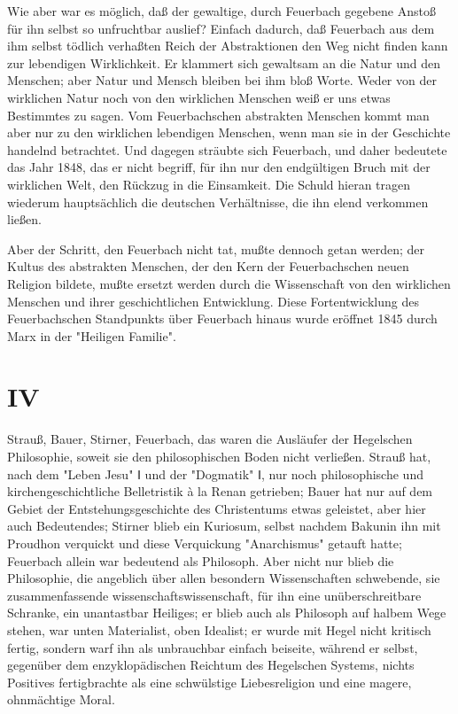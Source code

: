 Wie aber war es möglich, daß der gewaltige, durch Feuerbach
gegebene Anstoß für ihn selbst so unfruchtbar auslief? Einfach dadurch,
daß Feuerbach aus dem ihm selbst tödlich verhaßten Reich der
Abstraktionen den Weg nicht finden kann zur lebendigen Wirklichkeit. Er
klammert sich gewaltsam an die Natur und den Menschen; aber Natur und
Mensch bleiben bei ihm bloß Worte. Weder von der wirklichen Natur noch
von den wirklichen Menschen weiß er uns etwas Bestimmtes zu sagen. Vom
Feuerbachschen abstrakten Menschen kommt man aber nur zu den wirklichen
lebendigen Menschen, wenn man sie in der Geschichte handelnd betrachtet.
Und dagegen sträubte sich Feuerbach, und daher bedeutete das Jahr 1848,
das er nicht begriff, für ihn nur den endgültigen Bruch mit der
wirklichen Welt, den Rückzug in die Einsamkeit. Die Schuld hieran tragen
wiederum hauptsächlich die deutschen Verhältnisse, die ihn elend
verkommen ließen.

Aber der Schritt, den Feuerbach nicht tat, mußte dennoch getan
werden; der Kultus des abstrakten Menschen, der den Kern der
Feuerbachschen neuen Religion bildete, mußte ersetzt werden durch die
Wissenschaft von den wirklichen Menschen und ihrer geschichtlichen
Entwicklung. Diese Fortentwicklung des Feuerbachschen Standpunkts über
Feuerbach hinaus wurde eröffnet 1845 durch Marx in der "Heiligen
Familie".

\pagebreak

\section{IV}


Strauß, Bauer, Stirner, Feuerbach, das waren die Ausläufer der
Hegelschen Philosophie, soweit sie den philosophischen Boden nicht
verließen. Strauß hat, nach dem "Leben Jesu" ǁ und der "Dogmatik" ǁ, nur
noch philosophische und kirchengeschichtliche Belletristik à la Renan
getrieben; Bauer hat nur auf dem Gebiet der Entstehungsgeschichte des
Christentums etwas geleistet, aber hier auch Bedeutendes; Stirner blieb
ein Kuriosum, selbst nachdem Bakunin ihn mit Proudhon verquickt und
diese Verquickung "Anarchismus" getauft hatte; Feuerbach allein war
bedeutend als Philosoph. Aber nicht nur blieb die Philosophie, die
angeblich über allen besondern Wissenschaften schwebende, sie
zusammenfassende wissenschaftswissenschaft, für ihn eine
unüberschreitbare Schranke, ein unantastbar Heiliges; er blieb auch als
Philosoph auf halbem Wege stehen, war unten Materialist, oben Idealist;
er wurde mit Hegel nicht kritisch fertig, sondern warf ihn als
unbrauchbar einfach beiseite, während er selbst, gegenüber dem
enzyklopädischen Reichtum des Hegelschen Systems, nichts Positives
fertigbrachte als eine schwülstige Liebesreligion und eine magere,
ohnmächtige Moral.

